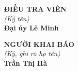 \documentclass[12pt,a4paper]{article}
\begin{document}
\vspace{0.8cm}
\noindent
\begin{minipage}[t]{0.48\textwidth}
    \begin{center}
        \textbf{ĐIỀU TRA VIÊN}\\[0.1cm]
        \textit{(Ký tên)}\\[1.6cm]
        \textbf{Đại úy Lê Minh}
    \end{center}
\end{minipage}
\hfill
\begin{minipage}[t]{0.48\textwidth}
    \begin{center}
        \textbf{NGƯỜI KHAI BÁO}\\[0.1cm]
        \textit{(Ký, ghi rõ họ tên)}\\[1.6cm]
        \textbf{Trần Thị Hà}
    \end{center}
\end{minipage}
\end{document}
